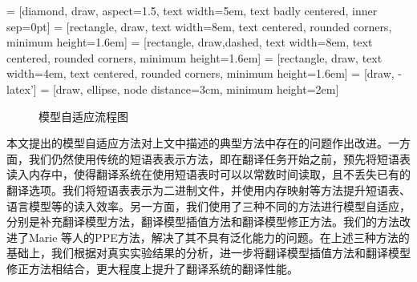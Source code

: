 \documentclass[master, winfont]{njuthesis}
\begin{document}
 = [diamond, draw, aspect=1.5,
    text width=5em, text badly centered, inner sep=0pt]
 = [rectangle, draw,
    text width=8em, text centered, rounded corners, minimum height=1.6em]
 = [rectangle, draw,dashed,
    text width=8em, text centered, rounded corners, minimum height=1.6em]
 = [rectangle, draw, text width=4em, text centered, rounded corners, minimum height=1.6em]
 = [draw, -latex']  = [draw, ellipse, node distance=3cm,
    minimum height=2em]
\begin {figure}[ht]
\centering
{}
\caption {\label{figure:adaptationFlow} 模型自适应流程图}
\end{figure}

本文提出的模型自适应方法对上文中描述的典型方法中存在的问题作出改进。一方面，我们仍然使用传统的短语表表示方法，即在翻译任务开始之前，预先将短语表读入内存中，使得翻译系统在使用短语表时可以以常数时间读取，且不丢失已有的翻译选项。我们将短语表表示为二进制文件，并使用内存映射等方法提升短语表、语言模型等的读入效率。另一方面，我们使用了三种不同的方法进行模型自适应，分别是补充翻译模型方法，翻译模型插值方法和翻译模型修正方法。我们的方法改进了Marie 等人的PPE方法，解决了其不具有泛化能力的问题。在上述三种方法的基础上，我们根据对真实实验结果的分析，进一步将翻译模型插值方法和翻译模型修正方法相结合，更大程度上提升了翻译系统的翻译性能。
\end{document}
